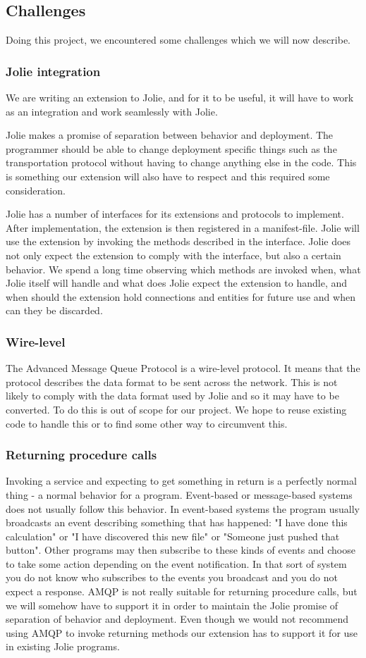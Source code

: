 \subsection{Challenges}
Doing this project, we encountered some challenges which we will now describe.
\subsubsection{Jolie integration}
\label{subsubsec:Jolie integration}
We are writing an extension to Jolie, and for it to be useful, it will have to work as an integration and work seamlessly with Jolie.

Jolie makes a promise of separation between behavior and deployment. The programmer should be able to change deployment specific things such as the transportation protocol without having to change anything else in the code. This is something our extension will also have to respect and this required some consideration.

Jolie has a number of interfaces for its extensions and protocols to implement. After implementation, the extension is then registered in a manifest-file. Jolie will use the extension by invoking the methods described in the interface. Jolie does not only expect the extension to comply with the interface, but also a certain behavior. We spend a long time observing which methods are invoked when, what Jolie itself will handle and what does Jolie expect the extension to handle, and when should the extension hold connections and entities for future use and when can they be discarded.
\subsubsection{Wire-level}
The Advanced Message Queue Protocol is a wire-level protocol. It means that the protocol describes the data format to be sent across the network. This is not likely to comply with the data format used by Jolie and so it may have to be converted. To do this is out of scope for our project. We hope to reuse existing code to handle this or to find some other way to circumvent this.
\subsubsection{Returning procedure calls}
Invoking a service and expecting to get something in return is a perfectly normal thing - a normal behavior for a program. Event-based or message-based systems does not usually follow this behavior. In event-based systems the program usually broadcasts an event describing something that has happened: "I have done this calculation" or "I have discovered this new file" or "Someone just pushed that button". Other programs may then subscribe to these kinds of events and choose to take some action depending on the event notification. In that sort of system you do not know who subscribes to the events you broadcast and you do not expect a response. AMQP is not really suitable for returning procedure calls, but we will somehow have to support it in order to maintain the Jolie promise of separation of behavior and deployment. Even though we would not recommend using AMQP to invoke returning methods our extension has to support it for use in existing Jolie programs.
